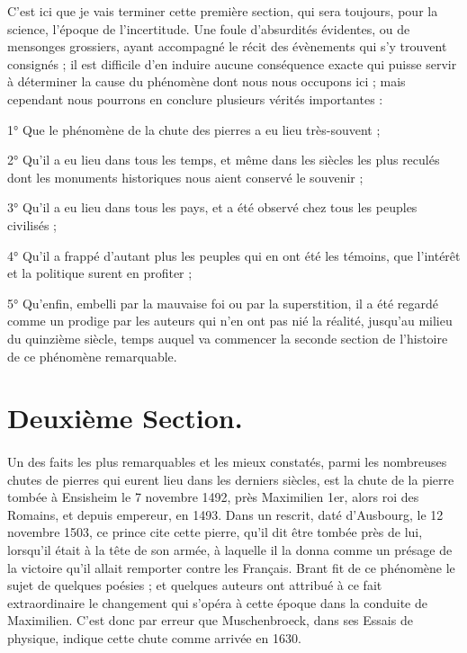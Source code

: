 \documentclass[a4paper, 12pt, oneside, french]{article}
\begin{document}
C'est ici que je vais terminer cette première section, qui sera toujours, pour la science, l'époque de l'incertitude. Une foule d'absurdités évidentes, ou de mensonges grossiers, ayant accompagné le récit des évènements qui s'y trouvent consignés ; il est difficile d'en induire aucune conséquence exacte qui puisse servir à déterminer la cause du phénomène dont nous nous occupons ici ; mais cependant nous pourrons en conclure plusieurs vérités importantes :

1° Que le phénomène de la chute des pierres a eu lieu très-souvent ;

2° Qu'il a eu lieu dans tous les temps, et même dans les siècles les plus reculés dont les monuments historiques nous aient conservé le souvenir ;

3° Qu'il a eu lieu dans tous les pays, et a été observé chez tous les peuples civilisés ;

4° Qu'il a frappé d'autant plus les peuples qui en ont été les témoins, que l'intérêt et la politique surent en profiter ;

5° Qu'enfin, embelli par la mauvaise foi ou par la superstition, il a été regardé comme un prodige par les auteurs qui n'en ont pas nié la réalité, jusqu'au milieu du quinzième siècle, temps auquel va commencer la seconde section de l'histoire de ce phénomène remarquable.
\clearpage
\section{Deuxième Section.}
\paragraph{}
Un des faits les plus remarquables et les mieux constatés, parmi les nombreuses chutes de pierres qui eurent lieu dans les derniers siècles, est la chute de la pierre tombée à Ensisheim le 7 novembre 1492, près Maximilien 1er, alors roi des Romains, et depuis empereur, en 1493. Dans un rescrit, daté d'Ausbourg, le 12 novembre 1503, ce prince cite cette pierre, qu'il dit être tombée près de lui, lorsqu'il était à la tête de son armée, à laquelle il la donna comme un présage de la victoire qu'il allait remporter contre les Français. Brant fit de ce phénomène le sujet de quelques poésies ; et quelques auteurs ont attribué à ce fait extraordinaire le changement qui s'opéra à cette époque dans la conduite de Maximilien. C'est donc par erreur que Muschenbroeck, dans ses Essais de physique, indique cette chute comme arrivée en 1630.
\end{document}
